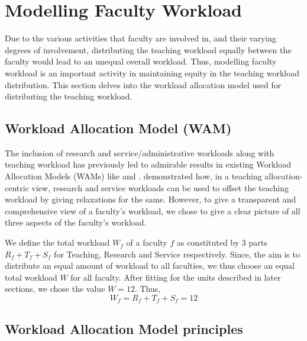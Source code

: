 \chapter{Modelling Faculty Workload}

\label{chapter:rts_ratio}


Due to the various activities that faculty are involved in, and their varying degrees of involvement, distributing the teaching workload equally between the faculty would lead to an unequal overall workload. Thus, modelling faculty workload is an important activity in maintaining equity in the teaching workload distribution. This section delves into the workload allocation model used for distributing the teaching workload.

\section{Workload Allocation Model (WAM)}
The inclusion of research and service/administrative workloads along with teaching workload has previously led to admirable results in existing Workload Allocation Models (WAMs) like \cite{finlay1994management} and \cite{griffith2020framework}. \cite{rohan2017} demonstrated how, in a teaching allocation-centric view, research and service workloads can be used to offset the teaching workload by giving relaxations for the same. However, to give a transparent and comprehensive view of a faculty's workload, we chose to give a clear picture of all three aspects of the faculty's workload.

We define the total workload \(W_f\) of a faculty \(f\) as constituted by 3 parts \(R_f + T_f + S_f\) for Teaching, Research and Service respectively. Since, the aim is to distribute an equal amount of workload to all faculties, we thus choose an equal total workload \(W\) for all faculty. After fitting for the units described in later sections, we chose the value \(W = 12\). Thus,
\[W_f = R_f + T_f + S_f = 12\]
\section{Workload Allocation Model principles}

